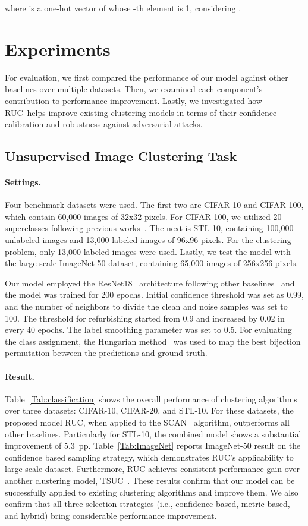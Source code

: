 \documentclass[final]{cvpr}
\newcommand{\model}{\textsf{RUC}}
\newcommand{\cutparagraphup}{\vspace*{-0.15in}}
\begin{document}
where  is a one-hot vector of  whose  -th element is 1, considering .

 
\section{Experiments}
For evaluation, we first compared the performance of our model against other baselines over multiple datasets. Then, we examined each component's contribution to performance improvement. Lastly, we investigated how \model{}~helps improve existing clustering models in terms of their confidence calibration and robustness against adversarial attacks. 
\subsection{Unsupervised Image Clustering Task}

\paragraph{Settings.} Four benchmark datasets were used. The first two are CIFAR-10 and CIFAR-100, which contain 60,000 images of 32x32 pixels. For CIFAR-100, we utilized 20 superclasses following previous works~\cite{van2020scan}. The next is STL-10, containing 100,000 unlabeled images and 13,000 labeled images of 96x96 pixels. For the clustering problem, only 13,000 labeled images were used. Lastly, we test the model with the large-scale ImageNet-50 dataset, containing 65,000 images of 256x256 pixels.

Our model employed the ResNet18~\cite{he2016deep} architecture following other baselines~\cite{hanmitigating,ji2019invariant,van2020scan} and the model was trained for 200 epochs. Initial confidence threshold  was set as 0.99, and the number of neighbors  to divide the clean and noise samples was set to 100. The threshold  for refurbishing started from 0.9 and increased by 0.02 in every 40 epochs. The label smoothing parameter  was set to 0.5. For evaluating the class assignment, the Hungarian method~\cite{kuhn1955hungarian} was used to map the best bijection permutation between the predictions and ground-truth.
\cutparagraphup
\paragraph{Result.} Table~\ref{Tab:classification} shows the overall performance of clustering algorithms over three datasets: CIFAR-10, CIFAR-20, and STL-10. For these datasets, the proposed model \model{}, when applied to the SCAN~\cite{van2020scan} algorithm, outperforms all other baselines. Particularly for STL-10, the combined model shows a substantial improvement of 5.3~pp. 
Table~\ref{Tab:ImageNet} reports ImageNet-50 result on the confidence based sampling strategy, which demonstrates \model{}'s 
applicability to large-scale dataset.
Furthermore, \model{} achieves consistent performance gain over another clustering model, TSUC~\cite{hanmitigating}. These results confirm that our model can be successfully applied to existing clustering algorithms and improve them. We also confirm that all three selection strategies (i.e., confidence-based, metric-based, and hybrid) bring considerable performance improvement. 
\end{document}

